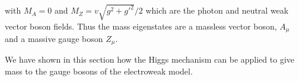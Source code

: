 with $M_{A} = 0$ and $M_{Z} = v \sqrt{g^{2} + g'^{2}} / 2$ which are
the photon and neutral weak vector boson fields.
Thus the mass eigenstates are a massless vector boson, $A_{\mu}$ and a
massive gauge boson $Z_{\mu}$.

We have shown in this section how the Higgs mechanism can be applied
to give mass to the gauge bosons of the electroweak model.
